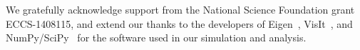 \acknowledgments
We gratefully acknowledge support from the National Science Foundation grant ECCS-1408115, and extend our thanks to the developers of Eigen~\cite{Eigen}, VisIt~\cite{VisIt}, and NumPy/SciPy~\cite{NumPy,SciPy} for the software used in our simulation and analysis.
\vspace{.5 cm}
